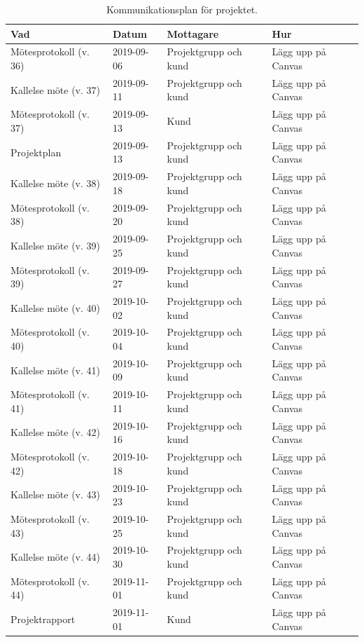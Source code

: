 \documentclass[a4paper]{article}
\begin{document}
\begin{table}[t]
\centering
\begin{tabular}{| l | l | l | l |}
\hline
\textbf{Vad}           & \textbf{Datum} & \textbf{Mottagare}    & \textbf{Hur}       \\ \hline
Mötesprotokoll (v. 36) & 2019-09-06   & Projektgrupp och kund & Lägg upp på Canvas \\ \hline
Kallelse möte  (v. 37) & 2019-09-11   & Projektgrupp och kund & Lägg upp på Canvas \\ \hline
Mötesprotokoll (v. 37) & 2019-09-13   & Kund                  & Lägg upp på Canvas \\ \hline
Projektplan            & 2019-09-13   & Projektgrupp och kund & Lägg upp på Canvas \\ \hline
Kallelse möte  (v. 38) & 2019-09-18   & Projektgrupp och kund & Lägg upp på Canvas \\ \hline
Mötesprotokoll (v. 38) & 2019-09-20   & Projektgrupp och kund & Lägg upp på Canvas \\ \hline
Kallelse möte  (v. 39) & 2019-09-25   & Projektgrupp och kund & Lägg upp på Canvas \\ \hline
Mötesprotokoll (v. 39) & 2019-09-27   & Projektgrupp och kund & Lägg upp på Canvas \\ \hline
Kallelse möte  (v. 40) & 2019-10-02   & Projektgrupp och kund & Lägg upp på Canvas \\ \hline
Mötesprotokoll (v. 40) & 2019-10-04   & Projektgrupp och kund & Lägg upp på Canvas \\ \hline
Kallelse möte  (v. 41) & 2019-10-09   & Projektgrupp och kund & Lägg upp på Canvas \\ \hline
Mötesprotokoll (v. 41) & 2019-10-11   & Projektgrupp och kund & Lägg upp på Canvas \\ \hline
Kallelse möte  (v. 42) & 2019-10-16   & Projektgrupp och kund & Lägg upp på Canvas \\ \hline
Mötesprotokoll (v. 42) & 2019-10-18   & Projektgrupp och kund & Lägg upp på Canvas \\ \hline
Kallelse möte  (v. 43) & 2019-10-23   & Projektgrupp och kund & Lägg upp på Canvas \\ \hline
Mötesprotokoll (v. 43) & 2019-10-25   & Projektgrupp och kund & Lägg upp på Canvas \\ \hline
Kallelse möte  (v. 44) & 2019-10-30   & Projektgrupp och kund & Lägg upp på Canvas \\ \hline
Mötesprotokoll (v. 44) & 2019-11-01   & Projektgrupp och kund & Lägg upp på Canvas \\ \hline
Projektrapport         & 2019-11-01   & Kund                  & Lägg upp på Canvas \\ \hline
\end{tabular}
\caption{Kommunikationsplan för projektet.}
\label{tabell:kommunikationsplan}
\end{table}
\end{document}
